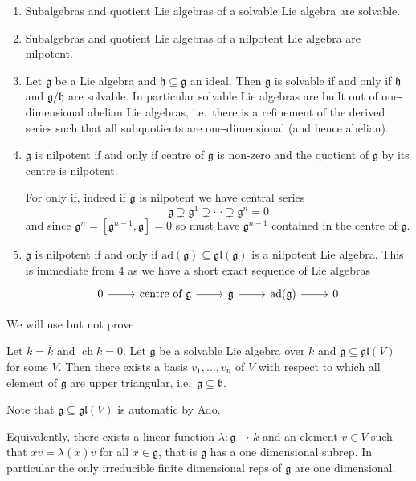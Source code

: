 \documentclass[a4paper]{article}
\newcommand*{\Lie}[1]{\mathfrak{#1}} %
\newcommand{\ad}{\mathrm{ad}} %
\DeclareMathOperator{\cha}{ch} %
\begin{document}
\begin{ex}\leavevmode
  \begin{enumerate}
  \item Subalgebras and quotient Lie algebras of a solvable Lie algebra are solvable.
  \item Subalgebras and quotient Lie algebras of a nilpotent Lie algebra are nilpotent.
  \item Let \(\Lie g\) be a Lie algebra and \(\Lie h \subseteq \Lie g\) an ideal. Then \(\Lie g\) is solvable if and only if \(\Lie h\) and \(\Lie g/\Lie h\) are solvable. In particular solvable Lie algebras are built out of one-dimensional abelian Lie algebras, i.e.\ there is a refinement of the derived series such that all subquotients are one-dimensional (and hence abelian).
  \item \(\Lie g\) is nilpotent if and only if centre of \(\Lie g\) is non-zero and the quotient of \(\Lie g\) by its centre is nilpotent.
    
    For only if, indeed if \(\Lie g\) is nilpotent we have central series
    \[
      \Lie g \supsetneq \Lie g^1 \supsetneq \cdots \supsetneq \Lie g^n = 0
    \]
    and since \(\Lie g^n = [\Lie g^{n - 1}, \Lie g] = 0\) so must have \(\Lie g^{n - 1}\) contained in the centre of \(\Lie g\).
  \item \(\Lie g\) is nilpotent if and only if \(\ad (\Lie g) \subseteq \Lie{gl}(\Lie g)\) is a nilpotent Lie algebra. This is immediate from 4 as we have a short exact sequence of Lie algebras
    \[
      \begin{tikzcd}
        0 \ar[r] & \text{centre of } \Lie g \ar[r] & \Lie g \ar[r] & \ad(\Lie g) \ar[r] & 0
      \end{tikzcd}
    \]
  \end{enumerate}
\end{ex}

We will use but not prove

\begin{theorem}[Lie]
  Let \(k = \overline k\) and \(\cha k = 0\). Let \(\Lie g\) be a solvable Lie algebra over \(k\) and \(\Lie g \subseteq \Lie{gl}(V)\) for some \(V\). Then there exists a basis \(v_1, \dots, v_n\) of \(V\) with respect to which all element of \(\Lie g\) are upper triangular, i.e.\ \(\Lie g \subseteq \Lie b\).
\end{theorem}
Note that \(\Lie g \subseteq \Lie{gl}(V)\) is automatic by Ado.

Equivalently, there exists a linear function \(\lambda: \Lie g \to k\) and an element \(v \in V\) such that \(xv = \lambda(x) v\) for all \(x \in \Lie g\), that is \(\Lie g\) has a one dimensional subrep. In particular the only irreducible finite dimensional reps of \(\Lie g\) are one dimensional.
\end{document}
